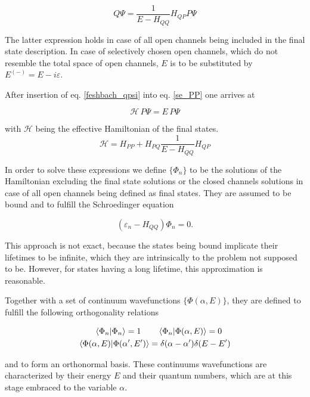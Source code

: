 \begin{equation}
  Q \Psi = \frac{1}{E-H_{QQ}} H_{QP} P \Psi \label{feshbach_qpsi}
\end{equation}

The latter expression holds in case of all open channels being included
in the final state description.
In case of selectively chosen open channels, which do not resemble the total
space of open channels,
$E$ is to be substituted by $E^{(-)}=E - i\varepsilon$.

After insertion of eq. \ref{feshbach_qpsi} into eq. \ref{se_PP} one arrives at

\begin{equation}
  \mathscr{H} \,P \Psi = E \,P \Psi \label{se_ppsi}
\end{equation}

with $\mathscr{H}$ being the effective Hamiltonian of the final states.
\begin{equation}
  \mathscr{H} = H_{PP} + H_{PQ} \frac{1}{E-H_{QQ}} H_{QP}
\end{equation}

In order to solve these expressions we define $\{\Phi_n\}$ to be the solutions
of the Hamiltonian excluding the final state solutions or the closed channels
solutions in case of all open channels being defined as final states.
They are assumed to be bound and to fulfill the
Schroedinger equation

\begin{equation}
  (\varepsilon_n - H_{QQ}) \Phi_n = 0 .
\end{equation}

This approach is not exact, because the states being bound implicate
their lifetimes to be infinite, which they are intrinsically
to the problem not supposed to be. However, for states having a long lifetime,
this approximation is reasonable.

Together with a set of continuum wavefunctions $\{\Phi(\alpha,E)\}$, they are
defined to fulfill the following orthogonality relations

\begin{align}
  \braket{\Phi_n|\Phi_n} = 1 \quad  & \quad \braket{\Phi_n|\Phi(\alpha,E)} = 0\\
  \braket{\Phi(\alpha,E)|\Phi(\alpha',E')} & = \delta(\alpha-\alpha') \delta(E-E')
\end{align}

and to form an orthonormal basis. These continuums wavefunctions are characterized
by their energy $E$ and their quantum numbers, which are at this stage embraced
to the variable $\alpha$.

